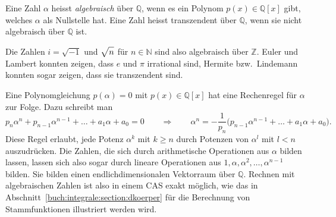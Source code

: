 \begin{definition}
Eine Zahl $\alpha$ heisst {\em algebraisch} über $\mathbb{Q}$,
wenn es ein Polynom
%
$p(x)\in \mathbb{Q}[x]$ gibt, welches $\alpha$ als Nullstelle hat.
Eine Zahl heisst transzendent über $\mathbb{Q}$, wenn sie nicht algebraisch
über $\mathbb{Q}$ ist.
\end{definition}

Die Zahlen $i=\sqrt{-1}$ und $\sqrt{n\mathstrut}$ für $n\in\mathbb{N}$
sind also algebraisch über $\mathbb{Z}$.
Euler und Lambert konnten zeigen, dass $e$ und $\pi$ irrational sind,
Hermite bzw.~Lindemann konnten sogar zeigen, dass sie transzendent sind.

Eine Polynomgleichung $p(\alpha)=0$ mit $p(x)\in\mathbb{Q}[x]$
hat eine Rechenregel für $\alpha$ zur Folge.
Dazu schreibt man
\[
p_n\alpha^n + p_{n-1}\alpha^{n-1} + \dots + a_1\alpha + a_0 =0
\qquad\Rightarrow\qquad
\alpha^n = -\frac{1}{p_n}\bigl(
p_{n-1}\alpha^{n-1}+\dots+a_1\alpha+a_0
\bigr).
\]
Diese Regel erlaubt, jede Potenz $\alpha^k$ mit $k\ge n$ durch
Potenzen von $\alpha^l$ mit $l<n$ auszudrücken.
Die Zahlen, die sich durch arithmetische Operationen aus
$\alpha$ bilden lassen, lassen sich also sogar durch lineare
Operationen aus $1,\alpha,\alpha^2,\dots,\alpha^{n-1}$
bilden.
Sie bilden einen endlichdimensionalen Vektorraum über $\mathbb{Q}$.
Rechnen mit algebraischen Zahlen ist also in einem CAS exakt möglich,
wie das in Abschnitt~\ref{buch:integrale:section:dkoerper}
für die Berechnung von Stammfunktionen illustriert werden wird.


